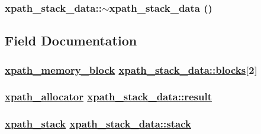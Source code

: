 \hypertarget{structxpath__stack__data_1df4e020ecc629b398336969c8490d98}{
\subsubsection[$\sim$xpath\_\-stack\_\-data]{\setlength{\rightskip}{0pt plus 5cm}xpath\_\-stack\_\-data::$\sim$xpath\_\-stack\_\-data ()}}
\label{structxpath__stack__data_1df4e020ecc629b398336969c8490d98}




\subsection{Field Documentation}
\hypertarget{structxpath__stack__data_6821cc444dd65d997467fd3f757f4aff}{
\subsubsection[blocks]{\setlength{\rightskip}{0pt plus 5cm}\hyperlink{structxpath__memory__block}{xpath\_\-memory\_\-block} \hyperlink{structxpath__stack__data_6821cc444dd65d997467fd3f757f4aff}{xpath\_\-stack\_\-data::blocks}\mbox{[}2\mbox{]}}}
\label{structxpath__stack__data_6821cc444dd65d997467fd3f757f4aff}


\hypertarget{structxpath__stack__data_b073a685c66383ded44076993afe62d6}{
\subsubsection[result]{\setlength{\rightskip}{0pt plus 5cm}\hyperlink{classxpath__allocator}{xpath\_\-allocator} \hyperlink{structxpath__stack__data_b073a685c66383ded44076993afe62d6}{xpath\_\-stack\_\-data::result}}}
\label{structxpath__stack__data_b073a685c66383ded44076993afe62d6}


\hypertarget{structxpath__stack__data_d26a92328f9aaf83fa62cb6695dbee90}{
\subsubsection[stack]{\setlength{\rightskip}{0pt plus 5cm}\hyperlink{structxpath__stack}{xpath\_\-stack} \hyperlink{structxpath__stack__data_d26a92328f9aaf83fa62cb6695dbee90}{xpath\_\-stack\_\-data::stack}}}
\label{structxpath__stack__data_d26a92328f9aaf83fa62cb6695dbee90}


